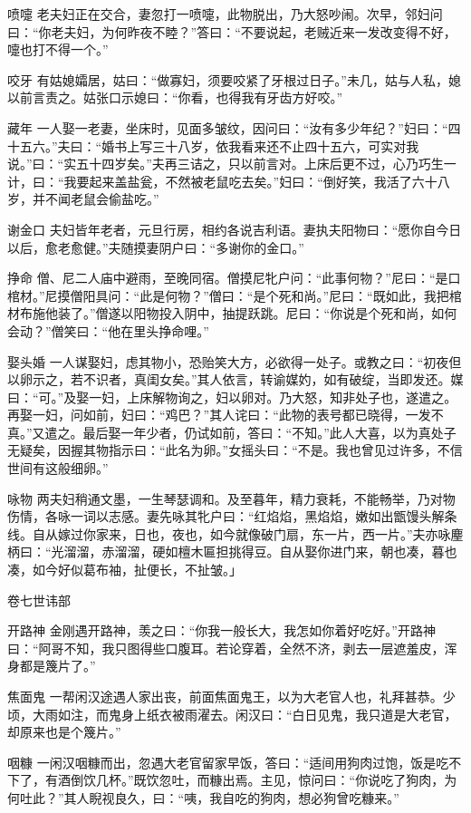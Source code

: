 \documentclass[12pt,UTF8]{ctexbook}
\begin{document}
喷嚏
老夫妇正在交合，妻忽打一喷嚏，此物脱出，乃大怒吵闹。次早，邻妇问曰：“你老夫妇，为何昨夜不睦？”答曰：“不要说起，老贼近来一发改变得不好，嚏也打不得一个。”

咬牙
有姑媳孀居，姑曰：“做寡妇，须要咬紧了牙根过日子。”未几，姑与人私，媳以前言责之。姑张口示媳曰：“你看，也得我有牙齿方好咬。”

藏年
一人娶一老妻，坐床时，见面多皱纹，因问曰：“汝有多少年纪？”妇曰：“四十五六。”夫曰：“婚书上写三十八岁，依我看来还不止四十五六，可实对我说。”曰：“实五十四岁矣。”夫再三诘之，只以前言对。上床后更不过，心乃巧生一计，曰：“我要起来盖盐瓮，不然被老鼠吃去矣。”妇曰：“倒好笑，我活了六十八岁，并不闻老鼠会偷盐吃。”

谢金口
夫妇皆年老者，元旦行房，相约各说吉利语。妻执夫阳物曰：“愿你自今日以后，愈老愈健。”夫随摸妻阴户曰：“多谢你的金口。”

挣命
僧、尼二人庙中避雨，至晚同宿。僧摸尼牝户问：“此事何物？”尼曰：“是口棺材。”尼摸僧阳具问：“此是何物？”僧曰：“是个死和尚。”尼曰：“既如此，我把棺材布施他装了。”僧遂以阳物投入阴中，抽提跃跳。尼曰：“你说是个死和尚，如何会动？”僧笑曰：“他在里头挣命哩。”

娶头婚
一人谋娶妇，虑其物小，恐贻笑大方，必欲得一处子。或教之曰：“初夜但以卵示之，若不识者，真闺女矣。”其人依言，转谕媒妁，如有破绽，当即发还。媒曰：“可。”及娶一妇，上床解物询之，妇以卵对。乃大怒，知非处子也，遂遣之。再娶一妇，问如前，妇曰：“鸡巴？”其人诧曰：“此物的表号都已晓得，一发不真。”又遣之。最后娶一年少者，仍试如前，答曰：“不知。”此人大喜，以为真处子无疑矣，因握其物指示曰：“此名为卵。”女摇头曰：“不是。我也曾见过许多，不信世间有这般细卵。”

咏物
两夫妇稍通文墨，一生琴瑟调和。及至暮年，精力衰耗，不能畅举，乃对物伤情，各咏一词以志感。妻先咏其牝户曰：“红焰焰，黑焰焰，嫩如出甑馒头解条线。自从嫁过你家来，日也，夜也，如今就像破门扇，东一片，西一片。”夫亦咏麈柄曰：“光溜溜，赤溜溜，硬如檀木匾担挑得豆。自从娶你进门来，朝也凑，暮也凑，如今好似葛布袖，扯便长，不扯皱。」

卷七世讳部

开路神
金刚遇开路神，羡之曰：“你我一般长大，我怎如你着好吃好。”开路神曰：“阿哥不知，我只图得些口腹耳。若论穿着，全然不济，剥去一层遮羞皮，浑身都是篾片了。”

焦面鬼
一帮闲汉途遇人家出丧，前面焦面鬼王，以为大老官人也，礼拜甚恭。少顷，大雨如注，而鬼身上纸衣被雨濯去。闲汉曰：“白日见鬼，我只道是大老官，却原来也是个篾片。”

咽糠
一闲汉咽糠而出，忽遇大老官留家早饭，答曰：“适间用狗肉过饱，饭是吃不下了，有酒倒饮几杯。”既饮忽吐，而糠出焉。主见，惊问曰：“你说吃了狗肉，为何吐此？”其人睨视良久，曰：“咦，我自吃的狗肉，想必狗曾吃糠来。”
\end{document}
